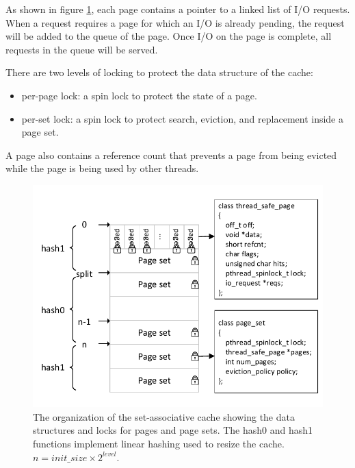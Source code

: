 
As shown in figure \ref{cache_struct1}, each page contains a pointer to
a linked list of I/O requests. When a request requires a page for which an
I/O is already pending, the request will be added
to the queue of the page. Once I/O on the page is complete, all requests in
the queue will be served. 

There are two levels of locking to protect the data structure of the cache:
\vspace{-10pt}
\begin{itemize}
\addtolength{\itemsep}{-5pt}
\item per-page lock: a spin lock to protect the state of a page.
\item per-set lock: a spin lock to protect search, eviction, and replacement
   inside a page set.
\vspace{-10pt}
\end{itemize}
\noindent A page also contains a reference count that prevents a page from
being evicted while the page is being used by other threads.

\begin{figure}[t]
\centering
\includegraphics[scale=0.7]{figs/SAFS/SA-cache.pdf}
\vspace{-5pt}
\caption{The organization of the set-associative cache showing the data structures
and locks for pages and page sets.  The hash0 and hash1 functions 
implement linear hashing \cite{linear_hash} used to resize the cache.
$n = init\_size \times 2^{level}$.}
\vspace{-5pt}
\label{cache_struct1}
\end{figure}


